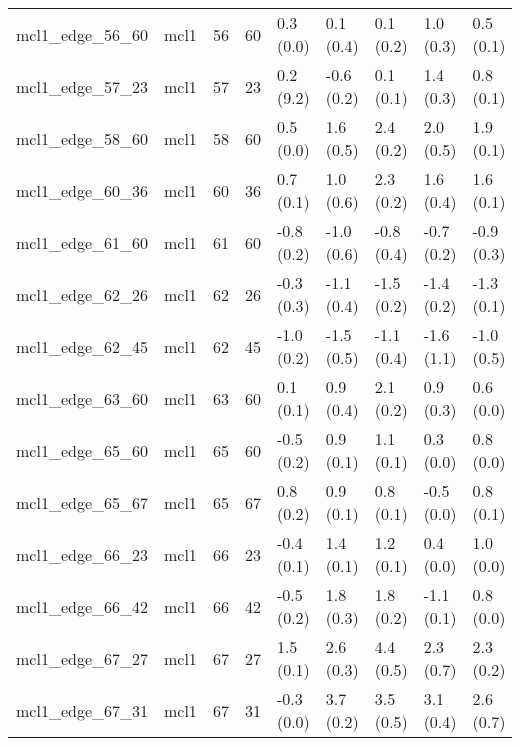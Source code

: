 \begin{tabular}{lllllllll}
mcl1\_edge\_56\_60                  &      mcl1 &          56 &          60 &   0.3 (0.0) &         0.1 (0.4) &   0.1 (0.2) &   1.0 (0.3) &   0.5 (0.1) \\
mcl1\_edge\_57\_23                  &      mcl1 &          57 &          23 &   0.2 (9.2) &        -0.6 (0.2) &   0.1 (0.1) &   1.4 (0.3) &   0.8 (0.1) \\
mcl1\_edge\_58\_60                  &      mcl1 &          58 &          60 &   0.5 (0.0) &         1.6 (0.5) &   2.4 (0.2) &   2.0 (0.5) &   1.9 (0.1) \\
mcl1\_edge\_60\_36                  &      mcl1 &          60 &          36 &   0.7 (0.1) &         1.0 (0.6) &   2.3 (0.2) &   1.6 (0.4) &   1.6 (0.1) \\
mcl1\_edge\_61\_60                  &      mcl1 &          61 &          60 &  -0.8 (0.2) &        -1.0 (0.6) &  -0.8 (0.4) &  -0.7 (0.2) &  -0.9 (0.3) \\
mcl1\_edge\_62\_26                  &      mcl1 &          62 &          26 &  -0.3 (0.3) &        -1.1 (0.4) &  -1.5 (0.2) &  -1.4 (0.2) &  -1.3 (0.1) \\
mcl1\_edge\_62\_45                  &      mcl1 &          62 &          45 &  -1.0 (0.2) &        -1.5 (0.5) &  -1.1 (0.4) &  -1.6 (1.1) &  -1.0 (0.5) \\
mcl1\_edge\_63\_60                  &      mcl1 &          63 &          60 &   0.1 (0.1) &         0.9 (0.4) &   2.1 (0.2) &   0.9 (0.3) &   0.6 (0.0) \\
mcl1\_edge\_65\_60                  &      mcl1 &          65 &          60 &  -0.5 (0.2) &         0.9 (0.1) &   1.1 (0.1) &   0.3 (0.0) &   0.8 (0.0) \\
mcl1\_edge\_65\_67                  &      mcl1 &          65 &          67 &   0.8 (0.2) &         0.9 (0.1) &   0.8 (0.1) &  -0.5 (0.0) &   0.8 (0.1) \\
mcl1\_edge\_66\_23                  &      mcl1 &          66 &          23 &  -0.4 (0.1) &         1.4 (0.1) &   1.2 (0.1) &   0.4 (0.0) &   1.0 (0.0) \\
mcl1\_edge\_66\_42                  &      mcl1 &          66 &          42 &  -0.5 (0.2) &         1.8 (0.3) &   1.8 (0.2) &  -1.1 (0.1) &   0.8 (0.0) \\
mcl1\_edge\_67\_27                  &      mcl1 &          67 &          27 &   1.5 (0.1) &         2.6 (0.3) &   4.4 (0.5) &   2.3 (0.7) &   2.3 (0.2) \\
mcl1\_edge\_67\_31                  &      mcl1 &          67 &          31 &  -0.3 (0.0) &         3.7 (0.2) &   3.5 (0.5) &   3.1 (0.4) &   2.6 (0.7) \\

\end{tabular}
